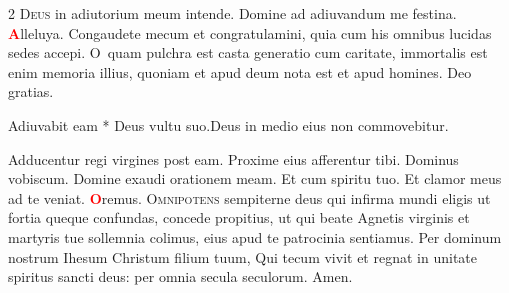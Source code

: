 \begin{multicols}{2}
\vspace{+1em}
\newline {}
\newline {}
\newline {}
\lettrine[lines=2]{\zallmancaps \color{Red} D}{eus} in adiutorium meum intende. \R Domine ad adiuvandum me festina. 
\newline \doxology \textcolor{Red}{\bfseries A}lleluya.
\newline {}
\newline {} Congaudete mecum et congratulamini, quia cum his omnibus lucidas sedes accepi.
\newline {}
\lettrine[lines=2]{\zallmancaps \color{Blue} O}{}\ quam pulchra est casta generatio cum caritate, immortalis est enim memoria illius, quoniam et apud deum nota est et apud homines. \R Deo gratias.
\begin{responsory-breve-full}
{Adiuvabit eam * Deus vultu suo.}{Deus in medio eius non commovebitur.}
\end{responsory-breve-full}%
\newline \V Adducentur regi virgines post eam. \R Proxime eius afferentur tibi.
\newline Dominus vobiscum.  Domine exaudi orationem meam.
\newline \R Et cum spiritu tuo.  Et clamor meus ad te veniat.
\newline \textcolor{Red}{\bfseries O}remus. 
\lettrine[lines=2]{\zallmancaps \color{Red} O}{mnipotens} sempiterne deus qui infirma mundi eligis ut fortia queque confundas, concede propitius, ut qui beate Agnetis virginis et martyris tue sollemnia colimus, eius apud te patrocinia sentiamus. Per dominum nostrum Ihesum Christum filium tuum, Qui tecum vivit et regnat in unitate spiritus sancti deus: per omnia secula seculorum. \R Amen.

\end{multicols}
